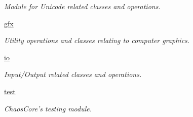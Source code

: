 \begin{DoxyCompactItemize}
\begin{DoxyCompactList}\small\item\em Module for Unicode related classes and operations. \end{DoxyCompactList}\item 
\hyperlink{namespacechaos_1_1gfx}{gfx}
\begin{DoxyCompactList}\small\item\em Utility operations and classes relating to computer graphics. \end{DoxyCompactList}\item 
\hyperlink{namespacechaos_1_1io}{io}
\begin{DoxyCompactList}\small\item\em Input/\-Output related classes and operations. \end{DoxyCompactList}\item 
\hyperlink{namespacechaos_1_1test}{test}
\begin{DoxyCompactList}\small\item\em Chaos\-Core's testing module. \end{DoxyCompactList}\end{DoxyCompactItemize}
